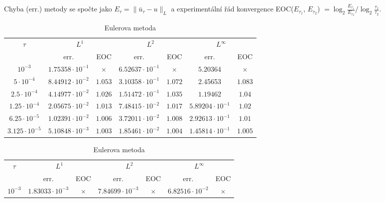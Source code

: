 \documentclass[11pt,american,czech]{article}
\begin{document}
\noindent
Chyba (err.) metody se spočte jako $E_{\tau} = \rVert\bar{u}_{\tau}-u\lVert_{L}$ a experimentální řád konvergence EOC($E_{\tau_{1}}$, $E_{\tau_{2}}$) $= {\log_{2}{\tfrac{E_{\tau_{1}}}{E_{\tau_{2}}}}}\big/{\log_{2}{\tfrac{\tau_{1}}{\tau_{2}}}}$.
\begin{table}[!htb]
	\centering\shorthandoff{-}
	\renewcommand{\arraystretch}{1.2}
	\begin{tabular}{ |c||c|c|c|c|c|c| }
	  \hline

	\multirow{2}{*}{$\tau$} & \multicolumn{2}{c|}{$L^{1}$} & \multicolumn{2}{c|}{$L^{2}$} & \multicolumn{2}{c|}{$L^{\infty}$} \\ \hhline{~------}
	& err. &  EOC & err. & EOC & err. & EOC \\
	  \hline \hline
	$10^{-3}$ & $1.75358\cdot10^{-1}$ & $\times$ & $6.52637\cdot10^{-1}$ & $\times$ & $5.20364$ & $\times$\\ \hline 
	$5\cdot10^{-4}$ & $8.44912\cdot10^{-2}$ & $1.053$ & $3.10358\cdot10^{-1}$ & $1.072$ & 2.45653 & $1.083$  \\ \hline
	$2.5\cdot10^{-4}$ & $4.14977\cdot10^{-2}$ & $1.026$ & $1.51472\cdot10^{-1}$ & $1.035$ & $1.19462$ & $1.04$  \\ \hline
	$1.25\cdot10^{-4}$ & $2.05675\cdot10^{-2}$ & $1.013$ & $7.48415\cdot10^{-2}$ & $1.017$ & $5.89204\cdot10^{-1}$ & $1.02$  \\ \hline
	$6.25\cdot10^{-5}$ & $1.02391\cdot10^{-2}$ & $1.006$ & $3.72011\cdot10^{-2}$ & $1.008$ & $2.92613\cdot10^{-1}$ & $1.01$  \\ \hline
	$3.125\cdot10^{-5}$ & $5.10848\cdot10^{-3}$ & $1.003$ & $1.85461\cdot10^{-2}$ & $1.004$ & $1.45814\cdot10^{-1}$ & $1.005$ \\ \hline
	\end{tabular}
	\caption{Eulerova metoda}
	\vspace{0.75cm}
	\begin{tabular}{ |c||c|c|c|c|c|c| }
	  \hline
	\multirow{2}{*}{$\tau$} & \multicolumn{2}{c|}{$L^{1}$} & \multicolumn{2}{c|}{$L^{2}$} & \multicolumn{2}{c|}{$L^{\infty}$} \\ \hhline{~------}
	& err. &  EOC & err. & EOC & err. & EOC \\
	  \hline \hline
	$10^{-3}$ & $1.83033\cdot10^{-3}$ & $\times$ & $7.84699\cdot10^{-3}$ & $\times$ & $6.82516\cdot10^{-2}$ & $\times$  \\ \hline 

\end{tabular}
\end{table}
\end{document}
